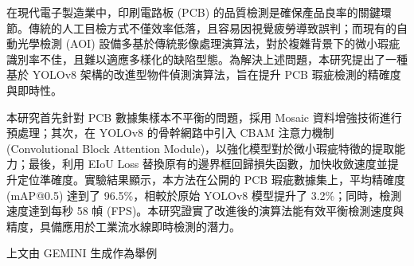 在現代電子製造業中，印刷電路板 (PCB) 的品質檢測是確保產品良率的關鍵環節。傳統的人工目檢方式不僅效率低落，且容易因視覺疲勞導致誤判；而現有的自動光學檢測 (AOI) 設備多基於傳統影像處理演算法，對於複雜背景下的微小瑕疵識別率不佳，且難以適應多樣化的缺陷型態。為解決上述問題，本研究提出了一種基於 YOLOv8 架構的改進型物件偵測演算法，旨在提升 PCB 瑕疵檢測的精確度與即時性。

本研究首先針對 PCB 數據集樣本不平衡的問題，採用 Mosaic 資料增強技術進行預處理；其次，在 YOLOv8 的骨幹網路中引入 CBAM 注意力機制 (Convolutional Block Attention Module)，以強化模型對於微小瑕疵特徵的提取能力；最後，利用 EIoU Loss 替換原有的邊界框回歸損失函數，加快收斂速度並提升定位準確度。實驗結果顯示，本方法在公開的 PCB 瑕疵數據集上，平均精確度 (mAP@0.5) 達到了 96.5\%，相較於原始 YOLOv8 模型提升了 3.2\%；同時，檢測速度達到每秒 58 幀 (FPS)。本研究證實了改進後的演算法能有效平衡檢測速度與精度，具備應用於工業流水線即時檢測的潛力。

上文由 GEMINI 生成作為舉例